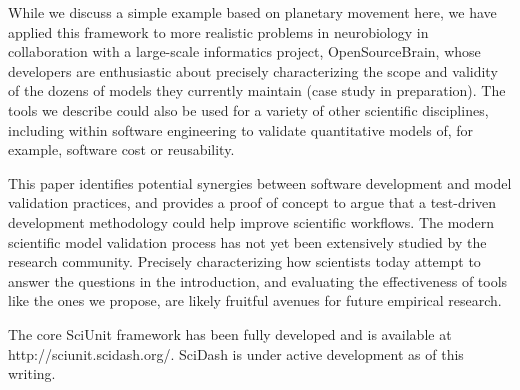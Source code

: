 \documentclass[9pt]{sig-alternate}
\begin{document}
While we discuss a simple example based on planetary movement here, we have applied this framework to more realistic problems in neurobiology in collaboration with a large-scale informatics project, OpenSourceBrain, whose developers are enthusiastic about precisely characterizing the scope and validity of the dozens of models they currently maintain (case study in preparation). The tools we describe could also be used for a variety of other scientific disciplines, including within software engineering to validate quantitative models of, for example, software cost or reusability.

This paper identifies potential  synergies between software development and model validation practices, and provides a proof of concept to argue that a test-driven development methodology could help improve scientific workflows. The modern scientific model validation process has not yet been extensively studied by  the research community. Precisely characterizing how scientists today attempt to answer the questions in the introduction, and evaluating the effectiveness of tools like the ones we propose, are likely fruitful avenues for future empirical research. 

The core SciUnit framework has been fully developed and is available at http://sciunit.scidash.org/. SciDash is under active development as of this writing.
\vspace{5px}
\end{document}
